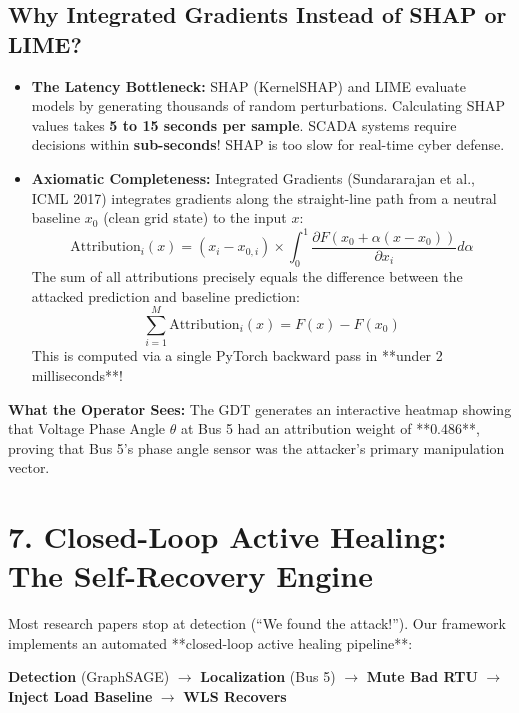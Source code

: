 \documentclass[10pt,a4paper]{article}
\begin{document}
\subsection{Why Integrated Gradients Instead of SHAP or LIME?}
\begin{itemize}[noitemsep]
    \item \textbf{The Latency Bottleneck:} SHAP (KernelSHAP) and LIME evaluate models by generating thousands of random perturbations. Calculating SHAP values takes \textbf{5 to 15 seconds per sample}. SCADA systems require decisions within \textbf{sub-seconds}! SHAP is too slow for real-time cyber defense.
    \item \textbf{Axiomatic Completeness:} Integrated Gradients (Sundararajan et al., ICML 2017) integrates gradients along the straight-line path from a neutral baseline $x_0$ (clean grid state) to the input $x$:
    \[
    \text{Attribution}_i(x) = (x_i - x_{0,i}) \times \int_{0}^{1} \frac{\partial F(x_0 + \alpha(x - x_0))}{\partial x_i} d\alpha
    \]
    The sum of all attributions precisely equals the difference between the attacked prediction and baseline prediction:
    \[
    \sum_{i=1}^{M} \text{Attribution}_i(x) = F(x) - F(x_0)
    \]
    This is computed via a single PyTorch backward pass in **under 2 milliseconds**!
\end{itemize}

\textbf{What the Operator Sees:} The GDT generates an interactive heatmap showing that Voltage Phase Angle $\theta$ at Bus 5 had an attribution weight of **0.486**, proving that Bus 5's phase angle sensor was the attacker's primary manipulation vector.

\section{7. Closed-Loop Active Healing: The Self-Recovery Engine}

Most research papers stop at detection (``We found the attack!''). Our framework implements an automated **closed-loop active healing pipeline**:

\begin{center}
\textbf{Detection} (GraphSAGE) $\longrightarrow$ \textbf{Localization} (Bus 5) $\longrightarrow$ \textbf{Mute Bad RTU} $\longrightarrow$ \textbf{Inject Load Baseline} $\longrightarrow$ \textbf{WLS Recovers}
\end{center}
\end{document}
